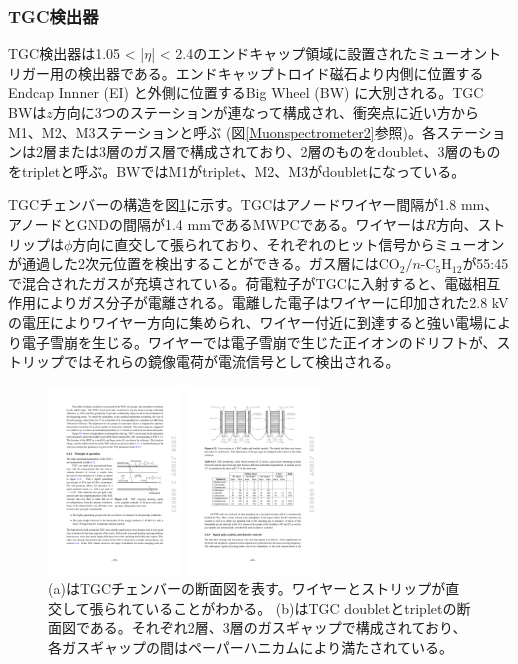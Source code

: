\subsubsection*{TGC検出器}
TGC検出器は1.05 < |$\eta$| < 2.4のエンドキャップ領域に設置されたミューオントリガー用の検出器である。エンドキャップトロイド磁石より内側に位置するEndcap Innner  (EI) と外側に位置するBig Wheel  (BW) に大別される。TGC BWは$z$方向に3つのステーションが連なって構成され、衝突点に近い方からM1、M2、M3ステーションと呼ぶ (図\ref{Muonspectrometer2}参照)。各ステーションは2層または3層のガス層で構成されており、2層のものをdoublet、3層のものをtripletと呼ぶ。BWではM1がtriplet、M2、M3がdoubletになっている。

TGCチェンバーの構造を図\ref{TGC_structure}に示す。TGCはアノードワイヤー間隔が1.8 mm、アノードとGNDの間隔が1.4 mmであるMWPCである。ワイヤーは$R$方向、ストリップは$\phi$方向に直交して張られており、それぞれのヒット信号からミューオンが通過した2次元位置を検出することができる。ガス層には$\mathrm{CO_2}/n\text{-}\mathrm{C_5H_{12}}$が55:45で混合されたガスが充填されている。荷電粒子がTGCに入射すると、電磁相互作用によりガス分子が電離される。電離した電子はワイヤーに印加された2.8 kVの電圧によりワイヤー方向に集められ、ワイヤー付近に到達すると強い電場により電子雪崩を生じる。ワイヤーでは電子雪崩で生じた正イオンのドリフトが、ストリップではそれらの鏡像電荷が電流信号として検出される。

\begin{figure}
\begin{minipage}[b]{.4\linewidth}
\centering
\includegraphics[height=5cm]{fig/Intro/TGC_structure.pdf}
\end{minipage}%
\begin{minipage}[b]{.6\linewidth}
\centering
\includegraphics[height=5cm]{fig/Intro/TGC_crosssection.pdf}
\end{minipage}%
\caption[TGCチェンバーの断面図]{ (a)はTGCチェンバーの断面図を表す\cite{JINST:2008}。ワイヤーとストリップが直交して張られていることがわかる。 (b)はTGC doubletとtripletの断面図である。それぞれ2層、3層のガスギャップで構成されており、各ガスギャップの間はペーパーハニカムにより満たされている。}
\label{TGC_structure}
\end{figure}

